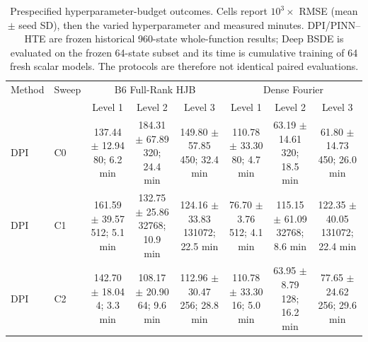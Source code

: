 \documentclass[10pt]{article}
\begin{document}
\begin{table}[t]
\centering\scriptsize
\setlength{\tabcolsep}{2.5pt}
\caption{Prespecified hyperparameter-budget outcomes. Cells report $10^3\!\times$ RMSE (mean $\pm$ seed SD), then the varied hyperparameter and measured minutes. DPI/PINN--HTE are frozen historical 960-state whole-function results; Deep BSDE is evaluated on the frozen 64-state subset and its time is cumulative training of 64 fresh scalar models. The protocols are therefore not identical paired evaluations.}
\label{tab:deep-bsde-budget-scaling}
\begin{tabular}{llcccccc}
\toprule
Method & Sweep & \multicolumn{3}{c}{B6 Full-Rank HJB} & \multicolumn{3}{c}{Dense Fourier} \\
 & & Level 1 & Level 2 & Level 3 & Level 1 & Level 2 & Level 3 \\
\midrule
DPI & C0 & \shortstack{137.44 $\pm$ 12.94\\80; 6.2 min} & \shortstack{184.31 $\pm$ 67.89\\320; 24.4 min} & \shortstack{149.80 $\pm$ 57.85\\450; 32.4 min} & \shortstack{110.78 $\pm$ 33.30\\80; 4.7 min} & \shortstack{63.19 $\pm$ 14.61\\320; 18.5 min} & \shortstack{61.80 $\pm$ 14.73\\450; 26.0 min} \\
DPI & C1 & \shortstack{161.59 $\pm$ 39.57\\512; 5.1 min} & \shortstack{132.75 $\pm$ 25.86\\32768; 10.9 min} & \shortstack{124.16 $\pm$ 33.83\\131072; 22.5 min} & \shortstack{76.70 $\pm$ 3.76\\512; 4.1 min} & \shortstack{115.15 $\pm$ 61.09\\32768; 8.6 min} & \shortstack{122.35 $\pm$ 40.05\\131072; 22.4 min} \\
DPI & C2 & \shortstack{142.70 $\pm$ 18.04\\4; 3.3 min} & \shortstack{108.17 $\pm$ 20.90\\64; 9.6 min} & \shortstack{112.96 $\pm$ 30.47\\256; 28.8 min} & \shortstack{110.78 $\pm$ 33.30\\16; 5.0 min} & \shortstack{63.95 $\pm$ 8.79\\128; 16.2 min} & \shortstack{77.65 $\pm$ 24.62\\256; 29.6 min} \\

\end{tabular}
\end{table}
\end{document}
